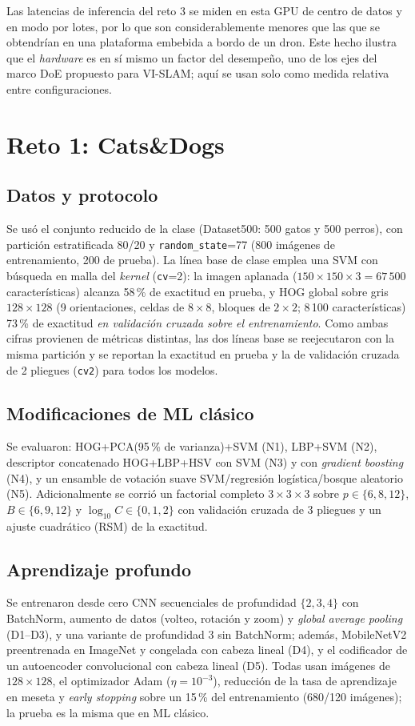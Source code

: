\documentclass[conference]{IEEEtran}
\begin{document}
Las latencias de inferencia del reto 3 se miden en esta GPU de centro de datos y en modo por lotes, por lo que son considerablemente menores que las que se obtendrían en una plataforma embebida a bordo de un dron. Este hecho ilustra que el \emph{hardware} es en sí mismo un factor del desempeño, uno de los ejes del marco DoE propuesto para VI-SLAM; aquí se usan solo como medida relativa entre configuraciones.

\section{Reto 1: Cats\&Dogs}
\subsection{Datos y protocolo}
Se usó el conjunto reducido de la clase (Dataset500: 500 gatos y 500 perros), con partición estratificada 80/20 y \texttt{random\_state}=77 (800 imágenes de entrenamiento, 200 de prueba). La línea base de clase emplea una SVM con búsqueda en malla del \emph{kernel} (\texttt{cv}=2): la imagen aplanada ($150\times150\times3=67\,500$ características) alcanza 58\,\% de exactitud en prueba, y HOG global sobre gris $128\times128$ (9 orientaciones, celdas de $8\times8$, bloques de $2\times2$; 8\,100 características) 73\,\% de exactitud \emph{en validación cruzada sobre el entrenamiento}. Como ambas cifras provienen de métricas distintas, las dos líneas base se reejecutaron con la misma partición y se reportan la exactitud en prueba y la de validación cruzada de 2 pliegues (\texttt{cv2}) para todos los modelos.

\subsection{Modificaciones de ML clásico}
Se evaluaron: HOG+PCA(95\,\% de varianza)+SVM (N1), LBP+SVM (N2), descriptor concatenado HOG+LBP+HSV con SVM (N3) y con \emph{gradient boosting} (N4), y un ensamble de votación suave SVM/regresión logística/bosque aleatorio (N5). Adicionalmente se corrió un factorial completo $3\times3\times3$ sobre $p\in\{6,8,12\}$, $B\in\{6,9,12\}$ y $\log_{10}C\in\{0,1,2\}$ con validación cruzada de 3 pliegues y un ajuste cuadrático (RSM) de la exactitud.

\subsection{Aprendizaje profundo}
Se entrenaron desde cero CNN secuenciales de profundidad $\{2,3,4\}$ con BatchNorm, aumento de datos (volteo, rotación y zoom) y \emph{global average pooling} (D1--D3), y una variante de profundidad 3 sin BatchNorm; además, MobileNetV2 \cite{sandler2018} preentrenada en ImageNet y congelada con cabeza lineal (D4), y el codificador de un autoencoder convolucional con cabeza lineal (D5). Todas usan imágenes de $128\times128$, el optimizador Adam ($\eta=10^{-3}$), reducción de la tasa de aprendizaje en meseta y \emph{early stopping} sobre un 15\,\% del entrenamiento (680/120 imágenes); la prueba es la misma que en ML clásico.
\end{document}
